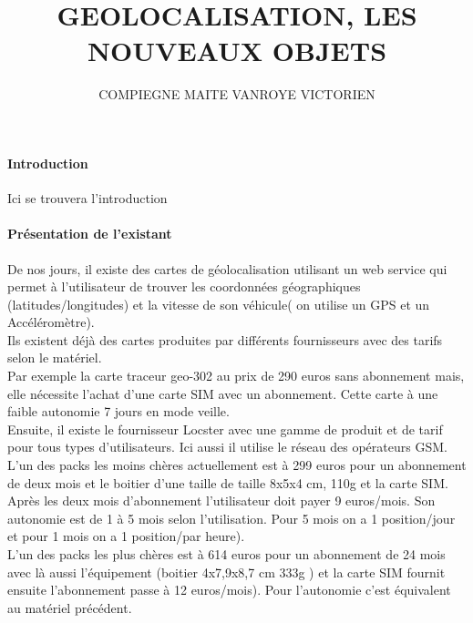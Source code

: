 \documentclass[10pt,a4paper]{article}
\author{COMPIEGNE MAITE VANROYE VICTORIEN}
\title{GEOLOCALISATION, LES NOUVEAUX OBJETS}
\begin{document}
\paragraph{Introduction}
Ici se trouvera l'introduction
\paragraph{Présentation de l'existant}
De nos jours, il existe des cartes de géolocalisation utilisant un web service qui permet à l'utilisateur de trouver les coordonnées géographiques (latitudes/longitudes) et la vitesse de son véhicule( on utilise un GPS et un Accéléromètre).\\Ils existent déjà des cartes produites par différents fournisseurs avec des tarifs selon le matériel.\\Par exemple la carte traceur geo-302 au prix de 290 euros sans abonnement mais, elle nécessite l'achat d'une carte SIM avec un abonnement. Cette carte à une faible autonomie 7 jours en mode veille.\\Ensuite, il existe le fournisseur Locster avec une gamme de produit et de tarif pour tous types d'utilisateurs. Ici aussi il utilise le réseau des opérateurs GSM.\\L'un des packs les moins chères actuellement est à 299 euros pour un abonnement de deux mois et le boitier d'une taille de taille 8x5x4 cm, 110g et la carte SIM. Après les deux mois d'abonnement l'utilisateur doit payer 9 euros/mois. Son autonomie est de 1 à 5 mois selon l'utilisation. Pour 5 mois on a 1 position/jour et pour 1 mois on a 1 position/par heure).\\L'un des packs les plus chères est à 614 euros pour un abonnement de 24 mois avec là aussi l'équipement (boitier 4x7,9x8,7 cm 333g ) et la carte SIM fournit ensuite l'abonnement passe à 12 euros/mois). Pour l'autonomie c'est équivalent au matériel précédent. 
\end{document}
